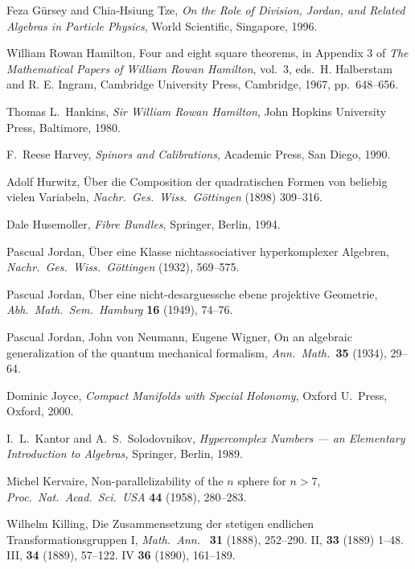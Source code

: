 \begin{thebibliography}{10}
 Feza G\"ursey and Chia-Hsiung Tze, {\sl On the Role of Division, 
Jordan, and Related Algebras in Particle Physics}, World Scientific,   
Singapore, 1996.   
   
 William Rowan Hamilton, Four and eight square   
theorems, in Appendix 3 of {\sl The Mathematical Papers of William   
Rowan Hamilton}, vol.\ 3, eds.\ H. Halberstam and R. E. Ingram,   
Cambridge University Press, Cambridge, 1967, pp.\ 648--656.   
   
 Thomas L.\ Hankins, {\sl Sir William Rowan Hamilton},   
John Hopkins University Press, Baltimore, 1980.   
  
 F.\ Reese Harvey, {\sl Spinors and Calibrations},    
Academic Press, San Diego, 1990.   
  
 Adolf Hurwitz, \"Uber die Composition der quadratischen   
Formen von beliebig vielen Variabeln, {\sl Nachr.\ Ges.\ Wiss.\ G\"ottingen} 
(1898) 309--316.   

 Dale Husemoller, {\sl Fibre Bundles}, Springer, Berlin,
1994.

 Pascual Jordan, \"Uber eine Klasse nichtassociativer   
hyperkomplexer Algebren, {\sl Nachr.\ Ges.\ Wiss.\ G\"ottingen} (1932),  
569--575.   
  
 Pascual Jordan, \"Uber eine nicht-desarguessche 
ebene projektive Geometrie, {\sl Abh.\ Math.\ Sem.\ Hamburg} 
{\bf 16} (1949), 74--76. 
 
 Pascual Jordan, John von Neumann, Eugene Wigner,    
On an algebraic generalization of the quantum mechanical formalism,   
{\sl Ann.\ Math.\ }{\bf 35} (1934), 29--64.   
 
 Dominic Joyce, {\sl Compact Manifolds with Special  
Holonomy}, Oxford U.\ Press, Oxford, 2000.  
 
 I.\ L.\ Kantor and A.\ S.\ Solodovnikov, {\sl Hypercomplex   
Numbers --- an Elementary Introduction to Algebras,} Springer, Berlin, 1989.  

 Michel Kervaire, Non-parallelizability of the $n$ 
sphere for $n > 7$, {\sl Proc.\ Nat.\ Acad.\ Sci.\ USA} {\bf 44} (1958),
280--283.

 Wilhelm Killing, Die Zusammensetzung der stetigen
endlichen Transformationsgruppen I, {\sl Math.\ Ann.\ } {\bf 31} (1888),
252--290.  II, {\bf 33} (1889) 1--48.  III, {\bf 34} (1889), 57--122.
IV {\bf 36} (1890), 161--189.


\end{thebibliography}
